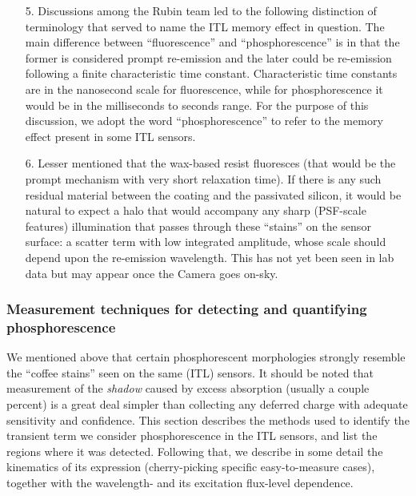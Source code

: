\begin{itemize}
    \item[5.] Discussions among the Rubin team led to the following distinction of terminology that served to name the ITL memory effect in question. The main difference between ``fluorescence'' and ``phosphorescence'' is in that the former is considered prompt re-emission and the later could be re-emission following a finite characteristic time constant. Characteristic time constants are in the nanosecond scale for fluorescence, while for phosphorescence it would be in the milliseconds to seconds range. For the purpose of this discussion, we adopt the word ``phosphorescence'' to refer to the memory effect present in some ITL sensors.
    \item[6.] Lesser mentioned that the wax-based resist fluoresces (that would be the prompt mechanism with very short relaxation time). If there is any such residual material between the coating and the passivated silicon, it would be natural to expect a halo that would accompany any sharp (PSF-scale features) illumination that passes through these ``stains'' on the sensor surface: a scatter term with low integrated amplitude, whose scale should depend upon the re-emission wavelength. This has not yet been seen in lab data but may appear once the Camera goes on-sky.
    
\end{itemize}

\subsubsection{Measurement techniques for detecting and quantifying phosphorescence}\label{phos-measurement}
We mentioned above that certain phosphorescent morphologies strongly resemble the ``coffee stains'' seen on the same (ITL) sensors. It should be noted that measurement of the {\it shadow} caused by excess absorption (usually a couple percent) is a great deal simpler than collecting any deferred charge with adequate sensitivity and confidence. This section describes the methods used to identify the transient term we consider phosphorescence in the ITL sensors, and list the regions where it was detected. Following that, we describe in some detail the kinematics of its expression (cherry-picking specific easy-to-measure cases), together with the wavelength- and its excitation flux-level dependence.

